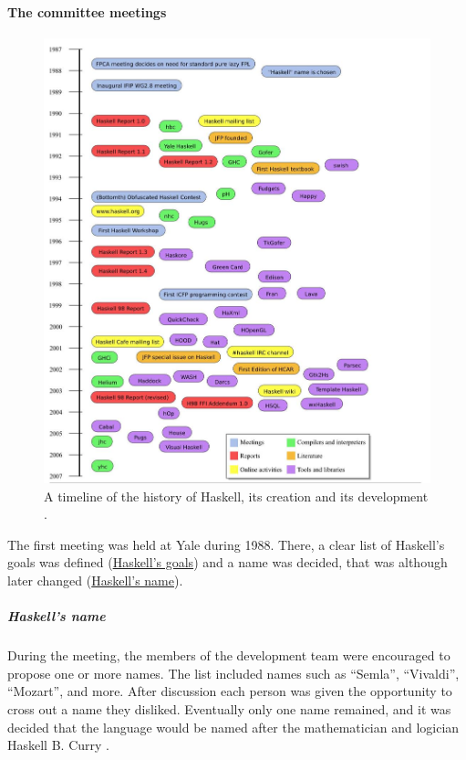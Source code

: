 \documentclass[a4paper, titlepage, twoside]{article}
\begin{document}
\paragraph*{The committee meetings}
\label{sec:orge7ad75f}

\begin{figure}[htbp]
\centering
\includegraphics[width=.9\linewidth]{img/2023-05-18_12-50-04_screenshot.png}
\caption{A timeline of the history of Haskell, its creation and its development \autocite{hudakHistoryHaskellBeing2007}.}
\end{figure}

The first meeting was held at Yale during 1988. There, a clear list of Haskell's goals was defined (\hyperref[sec:org439d4a0]{Haskell's goals}) and a name was decided, that was although later changed (\hyperref[sec:org6d7b4a7]{Haskell's name}).

\subparagraph*{Haskell's name}
\label{sec:org6d7b4a7}

During the meeting, the members of the development team were encouraged to propose one or more names. The list included names such as ``Semla'', ``Vivaldi'', ``Mozart'', and more. After discussion each person was given the opportunity to cross out a name they disliked. Eventually only one name remained, and it was decided that the language would be named after the mathematician and logician Haskell B. Curry \autocite{hudakHistoryHaskellBeing2007}.
\end{document}
